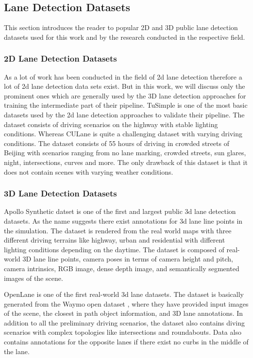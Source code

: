 \subsection{Lane Detection Datasets}
This section introduces the reader to popular 2D and 3D public lane detection datasets used for this work and by the research conducted in the respective field. 

\subsubsection{2D Lane Detection Datasets}
As a lot of work has been conducted in the field of 2d lane detection therefore a lot of 2d lane detection data sets exist. But in this work, we will discuss only the prominent ones which are generally used by the 3D lane detection approaches for training the intermediate part of their pipeline. \cite{Tusimple} TuSimple is one of the most basic datasets used by the 2d lane detection approaches to validate their pipeline. The dataset consists of driving scenarios on the highway with stable lighting conditions. Whereas CULane \cite{pan2018SCNN} is quite a challenging dataset with varying driving conditions. The dataset consists of 55 hours of driving in crowded streets of Beijing with scenarios ranging from no lane marking, crowded streets, sun glares, night, intersections, curves and more. The only drawback of this dataset is that it does not contain scenes with varying weather conditions.

\subsubsection{3D Lane Detection Datasets}
Apollo Synthetic datset\cite{guo2020gen} is one of the first and largest public 3d lane detection datasets. As the name suggests there exist annotations for 3d lane line points in the simulation. The dataset is rendered from the real world maps with three different driving terrains like highway, urban and residential with different lighting conditions depending on the daytime. The dataset is composed of real-world 3D lane line points, camera poses in terms of camera height and pitch, camera intrinsics, RGB image, dense depth image, and semantically segmented images of the scene.

OpenLane \cite{chen2022persformer} is one of the first real-world 3d lane datasets. The dataset is basically generated from the Waymo open dataset \cite{Sun_2020_CVPR}, where they have provided input images of the scene, the closest in path object information, and 3D lane annotations. In addition to all the preliminary driving scenarios, the dataset also contains diving scenarios with complex topologies like intersections and roundabouts. Data also contains annotations for the opposite lanes if there exist no curbs in the middle of the lane. 

